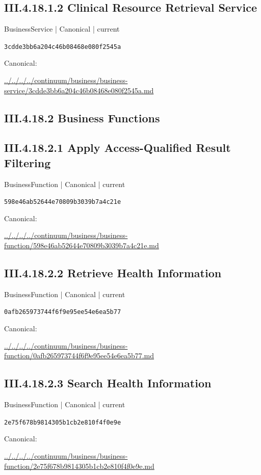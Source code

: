 \documentclass[10pt,a4paper]{article}
\begin{document}
\subsection*{III.4.18.1.2 Clinical Resource Retrieval Service}
{\small BusinessService | Canonical | current}\par
\texttt{3cdde3bb6a204c46b08468e080f2545a}\par
Canonical: \par
{\footnotesize\url{../../../../continuum/business/business-service/3cdde3bb6a204c46b08468e080f2545a.md}}\par
\subsection*{III.4.18.2 Business Functions}
\subsection*{III.4.18.2.1 Apply Access-Qualified Result Filtering}
{\small BusinessFunction | Canonical | current}\par
\texttt{598e46ab52644e70809b3039b7a4c21e}\par
Canonical: \par
{\footnotesize\url{../../../../continuum/business/business-function/598e46ab52644e70809b3039b7a4c21e.md}}\par
\subsection*{III.4.18.2.2 Retrieve Health Information}
{\small BusinessFunction | Canonical | current}\par
\texttt{0afb265973744f6f9e95ee54e6ea5b77}\par
Canonical: \par
{\footnotesize\url{../../../../continuum/business/business-function/0afb265973744f6f9e95ee54e6ea5b77.md}}\par
\subsection*{III.4.18.2.3 Search Health Information}
{\small BusinessFunction | Canonical | current}\par
\texttt{2e75f678b9814305b1cb2e810f4f0e9e}\par
Canonical: \par
{\footnotesize\url{../../../../continuum/business/business-function/2e75f678b9814305b1cb2e810f4f0e9e.md}}\par
\end{document}
